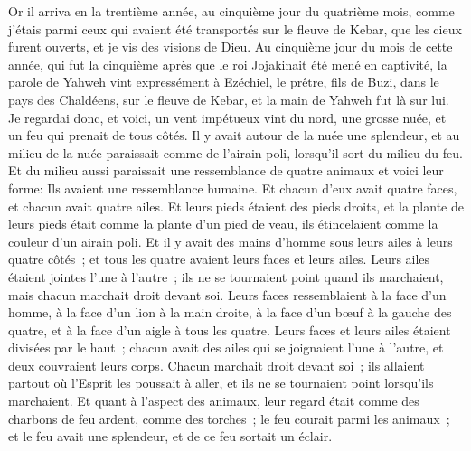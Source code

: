 \begin{multicols}{2}
\VerseOne{}Or il arriva en la trentième année, au cinquième jour du quatrième mois, comme j'étais parmi ceux qui avaient été transportés sur le fleuve de Kebar, que les cieux furent ouverts, et je vis des visions de Dieu.
Au cinquième jour du mois de cette année, qui fut la cinquième après que le roi Jojakinait été mené en captivité,
la parole de Yahweh vint expressément à Ezéchiel, le prêtre, fils de Buzi, dans le pays des Chaldéens, sur le fleuve de Kebar, et la main de Yahweh fut là sur lui.
Je regardai donc, et voici, un vent impétueux vint du nord, une grosse nuée, et un feu qui prenait de tous côtés. Il y avait autour de la nuée une splendeur, et au milieu de la nuée paraissait comme de l'airain poli, lorsqu'il sort du milieu du feu.
Et du milieu aussi paraissait une ressemblance de quatre animaux et voici leur forme: Ils avaient une ressemblance humaine.
Et chacun d'eux avait quatre faces, et chacun avait quatre ailes.
Et leurs pieds étaient des pieds droits, et la plante de leurs pieds était comme la plante d'un pied de veau, ils étincelaient comme la couleur d'un airain poli.
Et il y avait des mains d'homme sous leurs ailes à leurs quatre côtés~; et tous les quatre avaient leurs faces et leurs ailes.
Leurs ailes étaient jointes l'une à l'autre~; ils ne se tournaient point quand ils marchaient, mais chacun marchait droit devant soi.
Leurs faces ressemblaient à la face d'un homme, à la face d'un lion à la main droite, à la face d'un bœuf à la gauche des quatre, et à la face d'un aigle à tous les quatre.
Leurs faces et leurs ailes étaient divisées par le haut~; chacun avait des ailes qui se joignaient l'une à l'autre, et deux couvraient leurs corps.
Chacun marchait droit devant soi~; ils allaient partout où l'Esprit les poussait à aller, et ils ne se tournaient point lorsqu'ils marchaient.
Et quant à l'aspect des animaux, leur regard était comme des charbons de feu ardent, comme des torches~; le feu courait parmi les animaux~; et le feu avait une splendeur, et de ce feu sortait un éclair.

\end{multicols}
